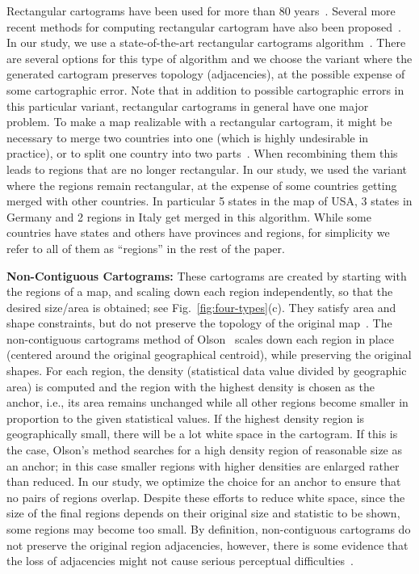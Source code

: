 \documentclass[10pt,journal,compsoc]{IEEEtran}
\begin{document}
Rectangular cartograms have been used for more than 80 years~\cite{Raisz34}. Several more recent methods for computing rectangular cartogram have also been proposed~\cite{BSV12, hkps04, ks07}. In our study, we use a state-of-the-art rectangular cartograms algorithm~\cite{BSV12}. There are several options for this type of algorithm and we choose the variant where the generated cartogram preserves topology (adjacencies), at the possible expense of some cartographic error.
Note that in addition to possible cartographic errors in this particular variant,  rectangular cartograms in general have one major problem. To make a map realizable with a rectangular cartogram, it might be necessary to merge two countries into one (which is highly undesirable in practice), or  
to split one country into two parts~\cite{ks07}. When recombining them this leads to regions that are no longer rectangular. In our study, we used the variant where the regions remain rectangular, at the expense of some countries getting merged with other countries. In particular 5 states in the map of USA, 3 states in Germany and 2 regions in Italy get merged in this algorithm. While some countries have states and others have provinces and regions, for simplicity we refer to all of them as ``regions'' in the rest of the paper.



\textbf{Non-Contiguous Cartograms:} 
These cartograms are created by starting with the regions of a map, and scaling down each region independently, so that the desired size/area is obtained; see Fig.~\ref{fig:four-types}(c). 
They satisfy area and shape constraints, but do not preserve the topology of the original map~\cite{Krauss_ms}. 
The non-contiguous cartograms method of Olson~\cite{Olson} scales down each region in place (centered around the original geographical centroid), while preserving the original shapes. For each region, the density (statistical data value divided by geographic area) is computed and the region with the highest density is chosen as the anchor, i.e., its area remains unchanged while all other regions become smaller in proportion to the given statistical values. If the highest density region is geographically small, there will be a lot white space in the cartogram. If this is the case, Olson's method searches for a high density region of reasonable size as an anchor; in this case smaller regions with higher densities are enlarged rather than reduced. In our study, we optimize the choice for an anchor to ensure that no pairs of regions overlap.
Despite these efforts to reduce white space, since the size of the final regions depends on their original size and statistic to be shown, some regions may become too small. 
By definition, non-contiguous cartograms do not preserve the original region adjacencies, however, there is some evidence that the loss of  adjacencies might not cause serious perceptual difficulties~\cite{KPN05}. 
\end{document}
